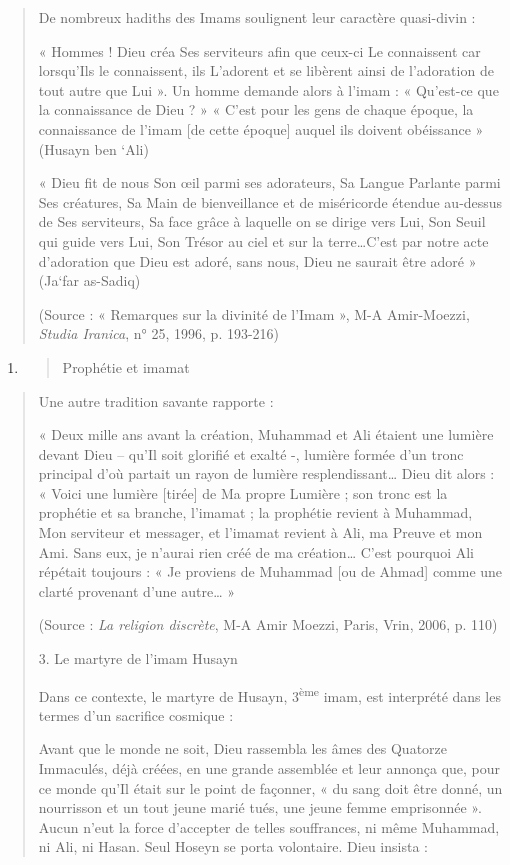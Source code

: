 \begin{quote}
De nombreux hadiths des Imams soulignent leur caractère quasi-divin :

« Hommes ! Dieu créa Ses serviteurs afin que ceux-ci Le connaissent car
lorsqu'Ils le connaissent, ils L'adorent et se libèrent ainsi de
l'adoration de tout autre que Lui ». Un homme demande alors à l'imam : «
Qu'est-ce que la connaissance de Dieu ? » « C'est pour les gens de
chaque époque, la connaissance de l'imam {[}de cette époque{]} auquel
ils doivent obéissance » (Husayn ben `Ali)

« Dieu fit de nous Son œil parmi ses adorateurs, Sa Langue Parlante
parmi Ses créatures, Sa Main de bienveillance et de miséricorde étendue
au-dessus de Ses serviteurs, Sa face grâce à laquelle on se dirige vers
Lui, Son Seuil qui guide vers Lui, Son Trésor au ciel et sur la
terre\ldots C'est par notre acte d'adoration que Dieu est adoré, sans
nous, Dieu ne saurait être adoré » (Ja`far as-Sadiq)

(Source : « Remarques sur la divinité de l'Imam », M-A Amir-Moezzi,
\emph{Studia Iranica}, n° 25, 1996, p. 193-216)
\end{quote}

\begin{enumerate}
\def\labelenumi{\arabic{enumi}.}
\setcounter{enumi}{2}
\item
  \begin{quote}
  {Prophétie et imamat}
  \end{quote}
\end{enumerate}

\begin{quote}
Une autre tradition savante rapporte :

« Deux mille ans avant la création, Muhammad et Ali étaient une lumière
devant Dieu -- qu'Il soit glorifié et exalté -, lumière formée d'un
tronc principal d'où partait un rayon de lumière resplendissant\ldots{}
Dieu dit alors : « Voici une lumière {[}tirée{]} de Ma propre Lumière ;
son tronc est la prophétie et sa branche, l'imamat ; la prophétie
revient à Muhammad, Mon serviteur et messager, et l'imamat revient à
Ali, ma Preuve et mon Ami. Sans eux, je n'aurai rien créé de ma
création\ldots{} C'est pourquoi Ali répétait toujours : « Je proviens de
Muhammad {[}ou de Ahmad{]} comme une clarté provenant d'une
autre\ldots{} »

(Source : \emph{La religion discrète}, M-A Amir Moezzi, Paris, Vrin,
2006, p. 110)

3. {Le martyre de l'imam Husayn}

Dans ce contexte, le martyre de Husayn, 3\textsuperscript{ème} imam, est
interprété dans les termes d'un sacrifice cosmique :

Avant que le monde ne soit, Dieu rassembla les âmes des Quatorze
Immaculés, déjà créées, en une grande assemblée et leur annonça que,
pour ce monde qu'Il était sur le point de façonner, « du sang doit être
donné, un nourrisson et un tout jeune marié tués, une jeune femme
emprisonnée ». Aucun n'eut la force d'accepter de telles souffrances, ni
même Muhammad, ni Ali, ni Hasan. Seul Hoseyn se porta volontaire. Dieu
insista :
\end{quote}

